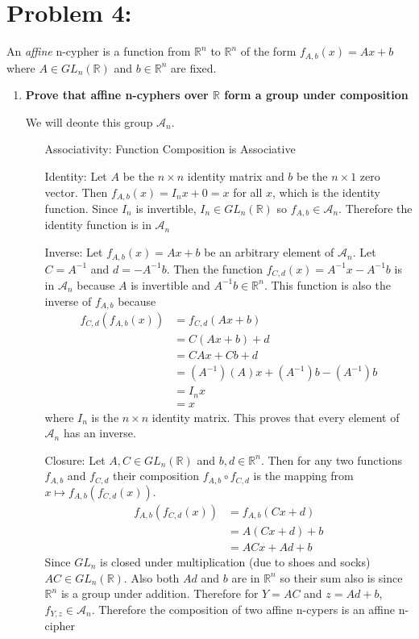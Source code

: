 \documentclass[12pt,letterpaper]{article}
\begin{document}
\section*{Problem 4:}
An \textit{affine} n-cypher is a function from $\mathbb{R}^n$ to $\mathbb{R}^n$ of the form $f_{A,b}(x) = Ax + b$ where $A\in GL_n(\mathbb{R})$ and $b\in \mathbb{R}^n$ are fixed.
\begin{enumerate}
    \item \textbf{Prove that affine n-cyphers over $\mathbb{R}$ form a group under composition}
    
    We will deonte this group $\mathcal{A}_n$. \cite{Algebra}
    \begin{itemize}
        \item [Associativity:] Function Composition is Associative
        \item [Identity:] Let $A$ be the $n\times n$ identity matrix and $b$ be the $n\times 1$ zero vector. Then $f_{A,b}(x)=I_{n}x + 0= x$ for all $x$, which is the identity function. Since $I_n$ is invertible, $I_n\in GL_n(\mathbb{R})$ so $f_{A,b}\in\mathcal{A}_n$. Therefore the identity function is in $\mathcal{A}_n$
        \item [Inverse:] Let $f_{A,b}(x)=Ax+b$ be an arbitrary element of $\mathcal{A}_n$. Let $C=A^{-1}$ and $d= -A^{-1}b$. Then the function $f_{C,d}(x)=A^{-1}x-A^{-1}b$ is in $\mathcal{A}_n$ because $A$ is invertible and $A^{-1}b\in \mathbb{R}^n$. This function is also the inverse of $f_{A,b}$ because
        \begin{align*}
            f_{C,d}(f_{A,b}(x)) &= f_{C,d}(Ax+b)\\
            &= C(Ax+b)+d\\
            &= CAx+Cb+d\\
            &= (A^{-1})(A)x+(A^{-1})b - (A^{-1})b\\
            &= I_nx\\
            &= x
        \end{align*}
        where $I_n$ is the $n\times n$ identity matrix. This proves that every element of $\mathcal{A}_n$ has an inverse.
        \newpage
        \item [Closure:] Let $A,C\in GL_n(\mathbb{R})$ and $b,d\in \mathbb{R}^n$. Then for any two functions $f_{A,b}$ and $f_{C,d}$ their composition $f_{A,b}\circ f_{C,d}$ is the mapping from $x \mapsto f_{A,b}(f_{C,d}(x)).$ 
        \begin{align*}
            f_{A,b}(f_{C,d}(x)) &= f_{A,b}(Cx+d)\\
            &= A(Cx + d) + b\\ 
            &= ACx + Ad + b
        \end{align*}
        Since $GL_n$ is closed under multiplication (due to shoes and socks) $AC\in GL_n(\mathbb{R})$. Also both $Ad$ and $b$ are in $\mathbb{R}^n$ so their sum also is since $\mathbb{R}^n$ is a group under addition. Therefore for $Y=AC$ and $z=Ad+b$, $f_{Y,z}\in\mathcal{A}_n$. Therefore the composition of two affine n-cypers is an affine n-cipher
         

\end{itemize}
\end{enumerate}
\end{document}
